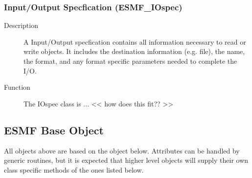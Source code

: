 \subsubsection{Input/Output Specfication (ESMF\_IOspec)}
\label{sec:iospec} 
\begin{description}
\item [Description] A Input/Output specfication contains all information necessary to
read or write objects.  It includes the destination information (e.g. file), the name,
the format, and any format specific parameters needed to complete the I/O.
\item [Function] The IOspec class is ...   << how does this fit?? >>
\end{description}


\subsection{ESMF Base Object}

All objects above are based on the object below.  Attributes
can be handled by generic routines, but it is expected that 
higher level objects will supply their own class specific
methods of the ones listed below.


